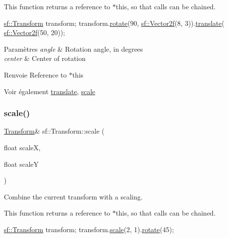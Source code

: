 This function returns a reference to $\ast$this, so that calls can be chained. 
\begin{DoxyCode}
\hyperlink{classsf_1_1Transform}{sf::Transform} transform;
transform.\hyperlink{classsf_1_1Transform_a3e548c3c9e3fb9d4bd43cf852669e555}{rotate}(90, \hyperlink{classsf_1_1Vector2}{sf::Vector2f}(8, 3)).\hyperlink{classsf_1_1Transform_ab54f6c8070cc05e2afcb3145fbf4395a}{translate}(
      \hyperlink{classsf_1_1Vector2}{sf::Vector2f}(50, 20));
\end{DoxyCode}



\begin{DoxyParams}{Paramètres}
{\em angle} & Rotation angle, in degrees \\
\hline
{\em center} & Center of rotation\\
\hline
\end{DoxyParams}
\begin{DoxyReturn}{Renvoie}
Reference to $\ast$this
\end{DoxyReturn}
\begin{DoxySeeAlso}{Voir également}
\hyperlink{classsf_1_1Transform_ab54f6c8070cc05e2afcb3145fbf4395a}{translate}, \hyperlink{classsf_1_1Transform_a3f46af807f69d74120fb836334268671}{scale} 
\end{DoxySeeAlso}
\mbox{\label{classsf_1_1Transform_a3f46af807f69d74120fb836334268671}} 
\subsubsection{\texorpdfstring{scale()}{scale()}\hspace{0.1cm}{\footnotesize\ttfamily [1/4]}}
{\footnotesize\ttfamily \hyperlink{classsf_1_1Transform}{Transform}\& sf\+::\+Transform\+::scale (\begin{DoxyParamCaption}\item[{float}]{scaleX,  }\item[{float}]{scaleY }\end{DoxyParamCaption})}



Combine the current transform with a scaling. 

This function returns a reference to $\ast$this, so that calls can be chained. 
\begin{DoxyCode}
\hyperlink{classsf_1_1Transform}{sf::Transform} transform;
transform.\hyperlink{classsf_1_1Transform_a3f46af807f69d74120fb836334268671}{scale}(2, 1).\hyperlink{classsf_1_1Transform_a3e548c3c9e3fb9d4bd43cf852669e555}{rotate}(45);
\end{DoxyCode}



